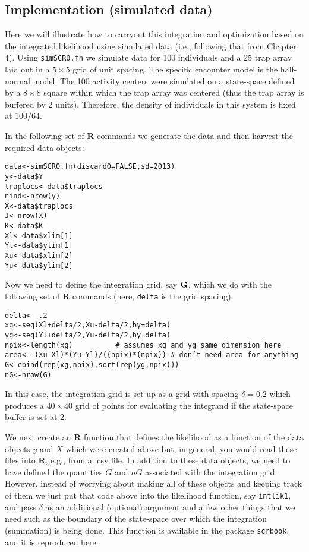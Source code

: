 \subsection{ Implementation (simulated data)}

Here we will illustrate how to carryout this integration and
optimization based on the integrated likelihood using simulated data
 (i.e., following that from Chapter 4). Using \mbox{\tt simSCR0.fn}
 we simulate data for 100 individuals and a 25 trap array
laid out in a $5 \times 5$ grid of unit spacing.  The specific encounter
model is the half-normal model. The 100 activity centers were
simulated on a state-space defined by a $8 \times 8$ square 
within which the
trap array was centered (thus the trap array is buffered by 2
units). Therefore, the density of individuals in this system is fixed
at $100/64$.

In the following set of {\bf R} commands we generate the data and 
then harvest the required data objects:
{\small
\begin{verbatim}
data<-simSCR0.fn(discard0=FALSE,sd=2013)
y<-data$Y
traplocs<-data$traplocs
nind<-nrow(y)
X<-data$traplocs
J<-nrow(X)
K<-data$K
Xl<-data$xlim[1]
Yl<-data$ylim[1]
Xu<-data$xlim[2]
Yu<-data$ylim[2]
\end{verbatim}
}
Now we need to define the integration grid, say ${\bf G}$, which we do with
the following set of {\bf R} commands (here, \mbox{\tt delta} is the grid spacing):
{\small
\begin{verbatim}
delta<- .2
xg<-seq(Xl+delta/2,Xu-delta/2,by=delta) 
yg<-seq(Yl+delta/2,Yu-delta/2,by=delta) 
npix<-length(xg)          # assumes xg and yg same dimension here
area<- (Xu-Xl)*(Yu-Yl)/((npix)*(npix)) # don’t need area for anything
G<-cbind(rep(xg,npix),sort(rep(yg,npix)))
nG<-nrow(G)
\end{verbatim}
}
In this case, the integration grid is set up as a grid with spacing
$\delta = 0.2$ which produces a $40 \times 40$ grid of points for evaluating the
integrand if the state-space buffer is set at 2.

We next create an {\bf R} function that defines the likelihood as a function
of the data objects $y$ and $X$ which were created above but, in general,
you would read these files into {\bf R}, e.g., from a .csv file.
In addition to these data
objects, we need to have defined the  quantities $G$ and $nG$ associated
with the integration grid.
However, instead of worrying about making all of these objects and
keeping track of them we just put that code above into the likelihood
function, say \mbox{\tt intlik1}, and pass $\delta$ as an additional (optional) argument and a
few other things that we need such as the boundary of the state-space
over which the integration (summation) is being done. This function is
available in the package \mbox{\tt scrbook}, and it is reproduced here:

